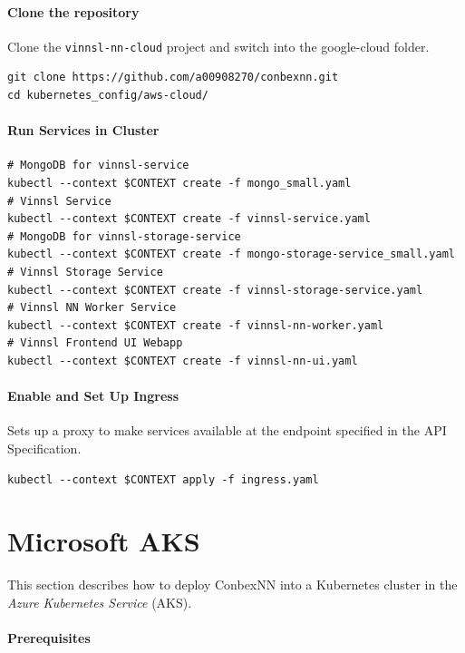 \paragraph{Clone the repository}\label{clone-the-repository-1}

Clone the \texttt{vinnsl-nn-cloud} project and switch into the
google-cloud folder.

\begin{verbatim}
git clone https://github.com/a00908270/conbexnn.git
cd kubernetes_config/aws-cloud/
\end{verbatim}

\paragraph{Run Services in Cluster}\label{run-services-in-cluster-2}

\begin{verbatim}
# MongoDB for vinnsl-service
kubectl --context $CONTEXT create -f mongo_small.yaml 
# Vinnsl Service
kubectl --context $CONTEXT create -f vinnsl-service.yaml
# MongoDB for vinnsl-storage-service
kubectl --context $CONTEXT create -f mongo-storage-service_small.yaml
# Vinnsl Storage Service
kubectl --context $CONTEXT create -f vinnsl-storage-service.yaml
# Vinnsl NN Worker Service
kubectl --context $CONTEXT create -f vinnsl-nn-worker.yaml
# Vinnsl Frontend UI Webapp
kubectl --context $CONTEXT create -f vinnsl-nn-ui.yaml
\end{verbatim}

\paragraph{Enable and Set Up Ingress}\label{enable-and-set-up-ingress-2}

Sets up a proxy to make services available at the endpoint specified in
the API Specification.

\begin{verbatim}
kubectl --context $CONTEXT apply -f ingress.yaml
\end{verbatim}

\section{Microsoft AKS}\label{microsoft-aks}

This section describes how to deploy ConbexNN into a Kubernetes cluster
in the \emph{Azure Kubernetes Service} (AKS).

\paragraph{Prerequisites}\label{prerequisites-3}

